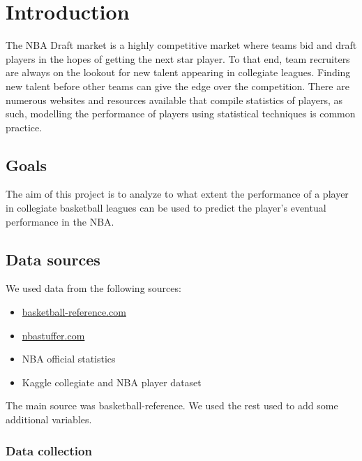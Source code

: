 
\section{Introduction}%
\label{sec:introduction}

The NBA Draft market is a highly competitive market where teams bid and draft
players in the hopes of getting the next star player. To that end, team
recruiters are always on the lookout for new talent appearing in collegiate
leagues. Finding new talent before other teams can give the edge over the
competition. There are numerous websites and resources available that compile
statistics of players, as such, modelling the performance of players using
statistical techniques is common practice.

\subsection{Goals}%
\label{sub:goals}

The aim of this project is to analyze to what extent the performance of a player
in collegiate basketball leagues can be used to predict the player's eventual
performance in the NBA.

\subsection{Data sources}%
\label{sub:data-sources}

We used data from the following sources:

\begin{itemize}
  \item \href{http://www.basketball-reference.com}{basketball-reference.com} \cite{noauthor_basketball_nodate}
  \item \href{http://www.nbastuffer.com}{nbastuffer.com} \cite{noauthor_nbastuffer_2017}
  \item NBA official statistics \cite{noauthor_draft_nodate}
  \item Kaggle collegiate and NBA player dataset \cite{noauthor_college_nodate,noauthor_t-rank_nodate}
\end{itemize}

The main source was basketball-reference. We used the rest used to add some
additional variables.

\subsubsection{Data collection}%
\label{ssub:data-collection}

